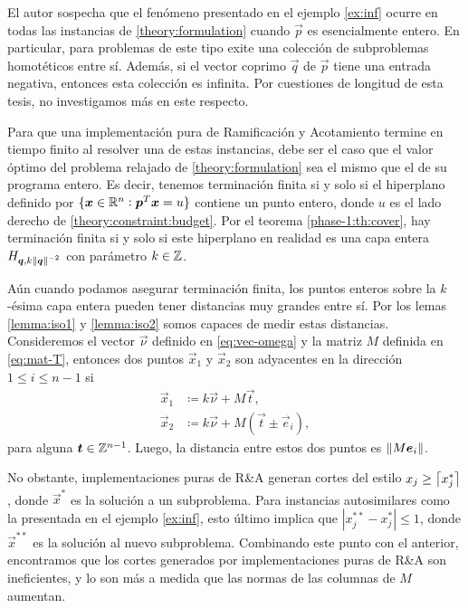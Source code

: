 El autor sospecha que el fenómeno presentado en el ejemplo \ref{ex:inf} ocurre en todas las
instancias de \eqref{theory:formulation} cuando $\vec{p}$ es esencialmente entero. En particular,
para problemas de este tipo exite una colección de subproblemas homotéticos entre sí. Además, si el
vector coprimo $\vec{q}$ de $\vec{p}$ tiene una entrada negativa, entonces esta colección es
infinita. Por cuestiones de longitud de esta tesis, no investigamos más en este respecto.

Para que una implementación pura de Ramificación y Acotamiento termine en tiempo finito al resolver
una de estas instancias, debe ser el caso que el valor óptimo del problema relajado de
\eqref{theory:formulation} sea el mismo que el de su programa entero. Es decir, tenemos terminación
finita si y solo si el hiperplano definido por
	$\lbrace \boldsymbol{x} \in \mathbb{R}^n \vcentcolon \boldsymbol{p}^T\boldsymbol{x} = u \rbrace$
contiene un punto entero, donde $u$ es el lado derecho de \eqref{theory:constraint:budget}. Por el
teorema \ref{phase-1:th:cover}, hay terminación finita si y solo si este hiperplano en realidad es
una capa entera $H_{\boldsymbol{q}, k\left\lVert \boldsymbol{q} \right\rVert^{-2}}$ con parámetro $k \in \mathbb{Z}$.

Aún cuando podamos asegurar terminación finita, los puntos enteros sobre la $k$-ésima capa entera
pueden tener distancias muy grandes entre sí. Por los lemas \ref{lemma:iso1} y \ref{lemma:iso2}
somos capaces de medir estas distancias. Consideremos el vector $\vec{\nu}$ definido en
\eqref{eq:vec-omega} y la matriz $M$ definida en \eqref{eq:mat-T}, entonces dos puntos $\vec{x}_1$ y
$\vec{x}_2$ son adyacentes en la dirección $1 \leq i \leq n - 1$ si
\begin{align*}
	\vec{x}_1 &\coloneq k\vec{\nu} + M\vec{t}, \\
	\vec{x}_2 &\coloneq k\vec{\nu} + M(\vec{t} \pm \vec{e}_i),
\end{align*}
para alguna $\boldsymbol{t} \in \mathbb{Z}^{n-1}$. Luego, la distancia entre estos dos puntos es
$\left\lVert M\boldsymbol{e}_i \right\rVert$.

No obstante, implementaciones puras de R\&A generan cortes del estilo $x_j \geq \left\lceil x_j^* \right\rceil$, donde
$\vec{x}^*$ es la solución a un subproblema. Para instancias autosimilares como la presentada en el
ejemplo \ref{ex:inf}, esto último implica que $|x_j^{**} - x_j^*| \leq 1$, donde $\vec{x}^{**}$ es
la solución al nuevo subproblema. Combinando este punto con el anterior, encontramos que los cortes
generados por implementaciones puras de R\&A son ineficientes, y lo son más a medida que las normas
de las columnas de $M$ aumentan.

